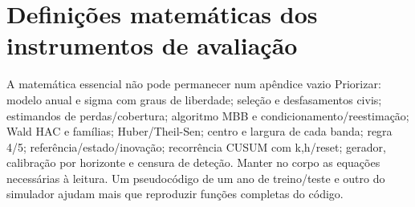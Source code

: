 
\chapter{Definições matemáticas dos instrumentos de avaliação}
\label{app:matematica}
{A matemática essencial não pode permanecer num apêndice vazio}
{Priorizar: modelo anual e sigma com graus de liberdade; seleção e
desfasamentos civis; estimandos de perdas/cobertura; algoritmo MBB e
condicionamento/reestimação; Wald HAC e famílias; Huber/Theil-Sen;
centro e largura de cada banda; regra 4/5; referência/estado/inovação;
recorrência CUSUM com k,h/reset; gerador, calibração por horizonte e
censura de deteção. Manter no corpo as equações necessárias à leitura.
Um pseudocódigo de um ano de treino/teste e outro do simulador ajudam
mais que reproduzir funções completas do código.}%

